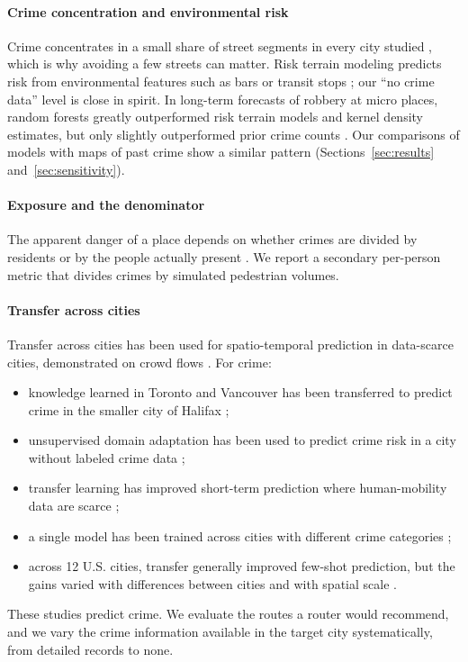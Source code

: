 \documentclass[preprint,12pt,authoryear]{elsarticle}
\begin{document}
\paragraph{Crime concentration and environmental risk} Crime concentrates in a small share of street segments in every city studied \citep{weisburd2015law}, which is why avoiding a few streets can matter. Risk terrain modeling predicts risk from environmental features such as bars or transit stops \citep{caplan2011rtm}; our ``no crime data'' level is close in spirit. In long-term forecasts of robbery at micro places, random forests greatly outperformed risk terrain models and kernel density estimates, but only slightly outperformed prior crime counts \citep{wheeler2021rtm}. Our comparisons of models with maps of past crime show a similar pattern (Sections~\ref{sec:results} and~\ref{sec:sensitivity}).

\paragraph{Exposure and the denominator} The apparent danger of a place depends on whether crimes are divided by residents or by the people actually present \citep{andresen2006measures,malleson2015ambient}. We report a secondary per-person metric that divides crimes by simulated pedestrian volumes.

\paragraph{Transfer across cities} Transfer across cities has been used for spatio-temporal prediction in data-scarce cities, demonstrated on crowd flows \citep{wang2019crosscity}. For crime:
\begin{itemize}
  \item knowledge learned in Toronto and Vancouver has been transferred to predict crime in the smaller city of Halifax \citep{bappee2021crossdomain};
  \item unsupervised domain adaptation has been used to predict crime risk in a city without labeled crime data \citep{zhou2023udac};
  \item transfer learning has improved short-term prediction where human-mobility data are scarce \citep{networktransfer2024};
  \item a single model has been trained across cities with different crime categories \citep{hypernetwork2025};
  \item across 12 U.S. cities, transfer generally improved few-shot prediction, but the gains varied with differences between cities and with spatial scale \citep{intercity2026}.
\end{itemize}
These studies predict crime. We evaluate the routes a router would recommend, and we vary the crime information available in the target city systematically, from detailed records to none.
\end{document}
